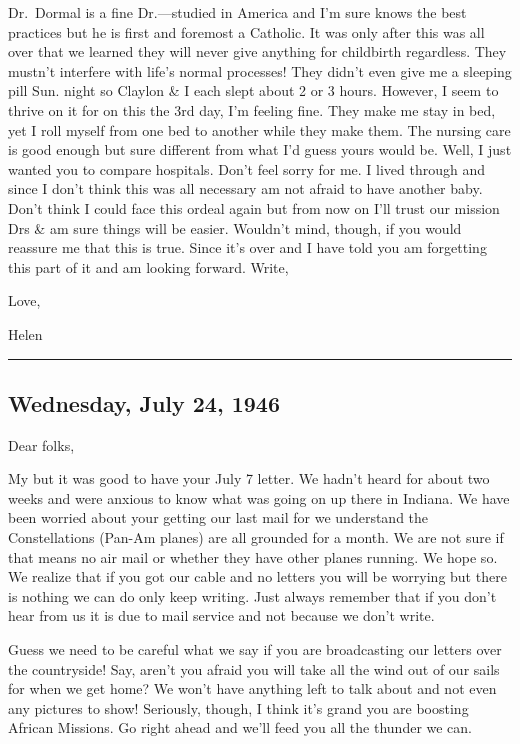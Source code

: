 \documentclass[
]{book}
\begin{document}
Dr.~Dormal is a fine Dr.---studied in America and I'm sure knows the best practices but he is first and foremost a Catholic. It was only after this was all over that we learned they will never give anything for childbirth regardless. They mustn't interfere with life's normal processes! They didn't even give me a sleeping pill Sun. night so Claylon \& I each slept about 2 or 3 hours. However, I seem to thrive on it for on this the 3rd day, I'm feeling fine. They make me stay in bed, yet I roll myself from one bed to another while they make them. The nursing care is good enough but sure different from what I'd guess yours would be. Well, I just wanted you to compare hospitals. Don't feel sorry for me. I lived through and since I don't think this was all necessary am not afraid to have another baby. Don't think I could face this ordeal again but from now on I'll trust our mission Drs \& am sure things will be easier. Wouldn't mind, though, if you would reassure me that this is true. Since it's over and I have told you am forgetting this part of it and am looking forward. Write,

Love,

Helen

\begin{center}\rule{0.5\linewidth}{0.5pt}\end{center}

\hypertarget{wednesday-july-24-1946}{%
\subsection{Wednesday, July 24, 1946}\label{wednesday-july-24-1946}}

Dear folks,

My but it was good to have your July 7 letter. We hadn't heard for about two weeks and were anxious to know what was going on up there in Indiana. We have been worried about your getting our last mail for we understand the Constellations (Pan-Am planes) are all grounded for a month. We are not sure if that means no air mail or whether they have other planes running. We hope so. We realize that if you got our cable and no letters you will be worrying but there is nothing we can do only keep writing. Just always remember that if you don't hear from us it is due to mail service and not because we don't write.

Guess we need to be careful what we say if you are broadcasting our letters over the countryside! Say, aren't you afraid you will take all the wind out of our sails for when we get home? We won't have anything left to talk about and not even any pictures to show! Seriously, though, I think it's grand you are boosting African Missions. Go right ahead and we'll feed you all the thunder we can.
\end{document}
